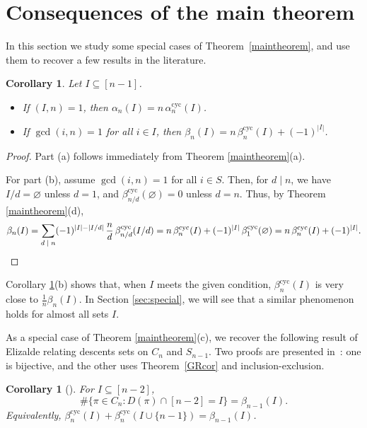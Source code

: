 \documentclass[12pt]{article}
\newcommand{\smallfrac}[2]{\textstyle\frac{#1}{#2}\displaystyle}
\newcommand{\Perm}{S}
\newcommand{\Cyc}{C}
\newcommand{\alphacyc}{\alpha^{\text{cyc}}}
\newcommand{\betacyc}{\beta^{\text{cyc}}}
\newtheorem{cor}[thm]{Corollary}
\theoremstyle{definition}
\begin{document}
\section{Consequences of the main theorem}\label{sec:consequences}

In this section we study some special cases of Theorem~\ref{maintheorem}, and use them to recover a few results in the literature.


\begin{cor} \label{cor1} Let $I \subseteq [n-1]$.
\begin{itemize}
\item[(a)] If $(I,n) = 1$, then $\alpha_n(I) = n\,\alphacyc_n(I)$. 
\item[(b)] If $\gcd(i,n) = 1$ for all $i \in I$, then $\beta_n(I) = n\,\betacyc_n(I) + (-1)^{|I|}$.
\end{itemize}
\end{cor}

\begin{proof} Part (a) follows immediately from Theorem \ref{maintheorem}(a). 

For part (b), assume $\gcd(i,n) = 1$ for all $i \in S$. Then, for $d \mid n$, we have $I/d = \varnothing$ unless $d = 1$, and $\betacyc_{n/d}(\varnothing) = 0$ unless $d = n$. Thus, by Theorem \ref{maintheorem}(d),
$$ \beta_n(I) = \sum_{\text{$d\mid n$}} (-1)^{|I|-|I/d|}\,\frac{n}{d}\,\betacyc_{n/d}(I/d) = n\,\betacyc_n(I) + (-1)^{|I|}\,\betacyc_1(\varnothing) = n\,\betacyc_n(I) + (-1)^{|I|}. \qedhere$$\end{proof}

Corollary \ref{cor1}(b) shows that, when $I$ meets the given condition, $\betacyc_n(I)$ is very close to $\smallfrac1n \beta_n(I)$. In Section \ref{sec:special}, we will see that a similar phenomenon holds for almost all sets $I$.

As a special case of Theorem \ref{maintheorem}(c), we recover the following result of Elizalde \cite{Elizalde} relating descents sets on $\Cyc_n$ and $\Perm_{n-1}$. Two proofs are presented in~\cite{Elizalde}: one is bijective, and the other uses Theorem~\ref{GRcor} and inclusion-exclusion.

\begin{cor}[{\cite[Cor.\ 4.1]{Elizalde}}] \label{CorSergi} 
For $I \subseteq [n-2]$,
\[ \#\{\pi \in \Cyc_n \colon D(\pi) \cap [n-2] = I\} = \beta_{n-1}(I). \]
Equivalently, $\betacyc_n(I) + \betacyc_n(I \cup \{n-1\}) = \beta_{n-1}(I)$.
\end{cor}
\end{document}
